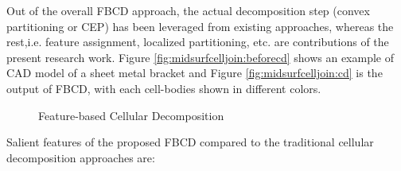 
Out of the overall FBCD approach, the actual decomposition step (convex partitioning or CEP) has been leveraged from existing approaches, whereas the rest,i.e. feature assignment, localized partitioning, etc. are contributions of the present research work. Figure \ref{fig:midsurfcelljoin:beforecd} shows an example of CAD model of a sheet metal bracket and Figure \ref{fig:midsurfcelljoin:cd} is the output of FBCD, with each cell-bodies shown in different colors. 



\begin{figure}[!h]
\centering     %
{}
\qquad
\caption{Feature-based Cellular Decomposition}
\label{fig:midsurfcelljoin:fbcd}
\end{figure}




 Salient features of the proposed FBCD compared to the traditional cellular decomposition approaches are:

